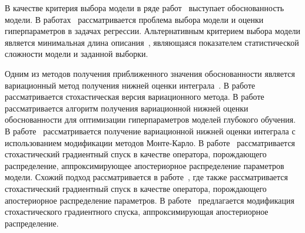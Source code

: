 \documentclass[11pt, a5paper]{dissert}
\theoremstyle{definition}
\begin{document}
В качестве критерия выбора модели в ряде работ~\cite{mackay,bishop,tokmakova,zaitsev,strijov_webber, strijov_dsc} выступает обоснованность модели. В работах~\cite{tokmakova,zaitsev,strijov_webber, strijov_dsc} рассматривается проблема выбора модели и оценки гиперпараметров в задачах регрессии. Альтернативным критерием выбора модели является минимальная длина описания~\cite{mdl}, являющаяся показателем статистической сложности модели и заданной выборки. 

Одним из методов получения приближенного значения обоснованности является вариационный метод получения нижней оценки интеграла~\cite{bishop}. В работе~\cite{hoffman} рассматривается стохастическая версия вариационного метода. В работе~\cite{nips} рассматривается алгоритм получения вариационной нижней оценки обоснованности  для оптимизации гиперпараметров моделей глубокого обучения. В работе~\cite{varmc} рассматривается получение вариационной нижней оценки интеграла с использованием модификации методов Монте-Карло. В работе~\cite{early} рассматривается стохастический градиентный спуск в качестве оператора, порождающего распределение, аппроксимирующее апостериорное распределение параметров модели. Схожий подход рассматривается в работе~\cite{sgd_cont}, где также рассматривается стохастический градиентный спуск в качестве оператора, порождающего апостериорное распределение параметров. В работе~\cite{langevin} предлагается модификация стохастического градиентного спуска, аппроксимирующая апостериорное распределение. 

\end{document}

